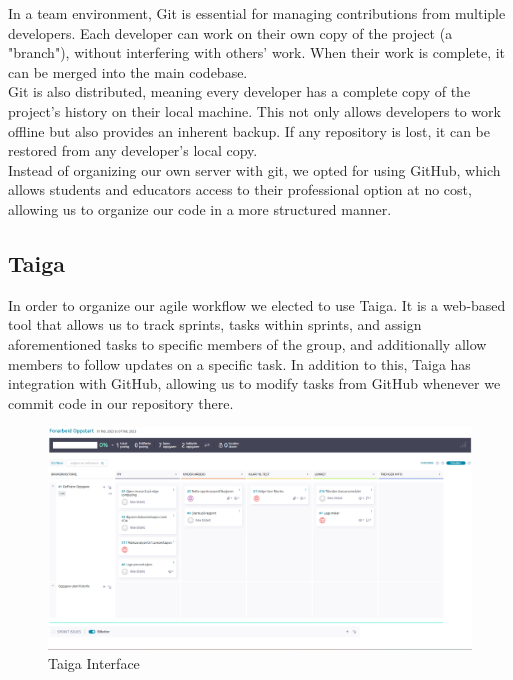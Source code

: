 In a team environment, Git is essential for managing contributions from multiple developers. Each developer can work on their own copy of the project (a "branch"), without interfering with others' work. When their work is complete, it can be merged into the main codebase.\\

Git is also distributed, meaning every developer has a complete copy of the project's history on their local machine. This not only allows developers to work offline but also provides an inherent backup. If any repository is lost, it can be restored from any developer's local copy.\\

Instead of organizing our own server with git, we opted for using GitHub, which allows students and educators access to their professional option at no cost, allowing us to organize our code in a more structured manner. \\

\subsection{Taiga}
In order to organize our agile workflow we elected to use Taiga. It is a web-based tool that allows us to track sprints, tasks within sprints, and assign aforementioned tasks to specific members of the group, and additionally allow members to follow updates on a specific task. In addition to this, Taiga has integration with GitHub, allowing us to modify tasks from GitHub whenever we commit code in our repository there.


\begin{figure}[h]
    \centering
    \includegraphics[width=\textwidth]{fig/Taiga eksempel.png}
    \caption{Taiga Interface}
\end{figure}

